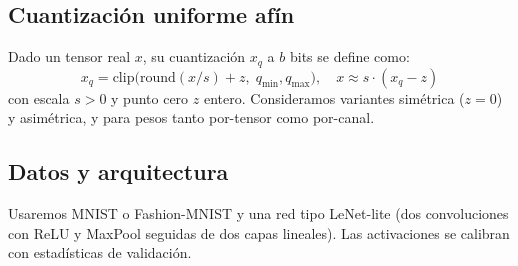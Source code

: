 \subsection*{Cuantización uniforme afín}
Dado un tensor real $x$, su cuantización $x_q$ a $b$ bits se define como:
\[ x_q = \mathrm{clip}\big(\mathrm{round}(x/s) + z,\; q_{\min}, q_{\max}\big), \quad
   x \approx s \cdot (x_q - z) \]
con escala $s>0$ y punto cero $z$ entero. Consideramos variantes simétrica ($z=0$) y
asimétrica, y para pesos tanto por-tensor como por-canal.

\subsection*{Datos y arquitectura}
Usaremos MNIST o Fashion-MNIST y una red tipo LeNet-lite (dos convoluciones con
ReLU y MaxPool seguidas de dos capas lineales). Las activaciones se calibran con
estadísticas de validación.
